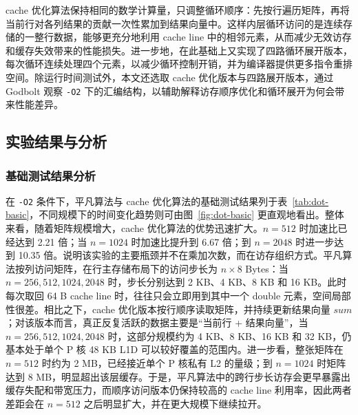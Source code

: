 \documentclass[a4paper,10pt]{article}
\begin{document}
cache 优化算法保持相同的数学计算量，只调整循环顺序：先按行遍历矩阵，再将当前行对各列结果的贡献一次性累加到结果向量中。这样内层循环访问的是连续存储的一整行数据，能够更充分地利用 cache line 中的相邻元素，从而减少无效访存和缓存失效带来的性能损失。进一步地，在此基础上又实现了四路循环展开版本，每次循环连续处理四个元素，以减少循环控制开销，并为编译器提供更多指令重排空间。除运行时间测试外，本文还选取 cache 优化版本与四路展开版本，通过 Godbolt 观察 \texttt{-O2} 下的汇编结构，以辅助解释访存顺序优化和循环展开为何会带来性能差异。

\subsection{实验结果与分析}
\subsubsection{基础测试结果分析}
在 \texttt{-O2} 条件下，平凡算法与 cache 优化算法的基础测试结果列于表~\ref{tab:dot-basic}，不同规模下的时间变化趋势则可由图~\ref{fig:dot-basic} 更直观地看出。整体来看，随着矩阵规模增大，cache 优化算法的优势迅速扩大。$n=512$ 时加速比已经达到 2.21 倍；当 $n=1024$ 时加速比提升到 6.67 倍；到 $n=2048$ 时进一步达到 10.35 倍。说明该实验的主要瓶颈并不在乘加次数，而在访存组织方式。平凡算法按列访问矩阵，在行主存储布局下的访问步长为 $n\times 8$ Bytes：当 $n=256,512,1024,2048$ 时，步长分别达到 2 KB、4 KB、8 KB 和 16 KB。此时每次取回 64 B cache line 时，往往只会立即用到其中一个 double 元素，空间局部性很差。相比之下，cache 优化版本按行顺序读取矩阵，并持续更新结果向量 $sum$；对该版本而言，真正反复活跃的数据主要是“当前行 + 结果向量”，当 $n=256,512,1024,2048$ 时，这部分规模约为 4 KB、8 KB、16 KB 和 32 KB，仍基本处于单个 P 核 48 KB L1D 可以较好覆盖的范围内。进一步看，整张矩阵在 $n=512$ 时约为 2 MB，已经接近单个 P 核私有 L2 的量级；到 $n=1024$ 时矩阵达到 8 MB，明显超出该层缓存。于是，平凡算法中的跨行步长访存会更早暴露出缓存失配和带宽压力，而顺序访问版本仍保持较高的 cache line 利用率，因此两者差距会在 $n=512$ 之后明显扩大，并在更大规模下继续拉开。
\end{document}
